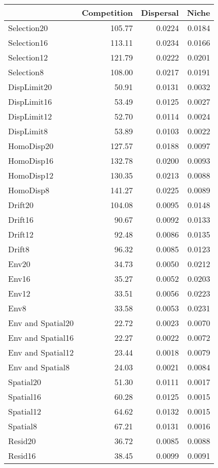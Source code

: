 \begin{longtable}{l|rrr}
\toprule
\multicolumn{1}{l}{} & Competition & Dispersal & Niche \\ 
\midrule
Selection20 & 105.77 & 0.0224 & 0.0184 \\ 
Selection16 & 113.11 & 0.0234 & 0.0166 \\ 
Selection12 & 121.79 & 0.0222 & 0.0201 \\ 
Selection8 & 108.00 & 0.0217 & 0.0191 \\ 
DispLimit20 & 50.91 & 0.0131 & 0.0032 \\ 
DispLimit16 & 53.49 & 0.0125 & 0.0027 \\ 
DispLimit12 & 52.70 & 0.0114 & 0.0024 \\ 
DispLimit8 & 53.89 & 0.0103 & 0.0022 \\ 
HomoDisp20 & 127.57 & 0.0188 & 0.0097 \\ 
HomoDisp16 & 132.78 & 0.0200 & 0.0093 \\ 
HomoDisp12 & 130.35 & 0.0213 & 0.0088 \\ 
HomoDisp8 & 141.27 & 0.0225 & 0.0089 \\ 
Drift20 & 104.08 & 0.0095 & 0.0148 \\ 
Drift16 & 90.67 & 0.0092 & 0.0133 \\ 
Drift12 & 92.48 & 0.0086 & 0.0135 \\ 
Drift8 & 96.32 & 0.0085 & 0.0123 \\ 
Env20 & 34.73 & 0.0050 & 0.0212 \\ 
Env16 & 35.27 & 0.0052 & 0.0203 \\ 
Env12 & 33.51 & 0.0056 & 0.0223 \\ 
Env8 & 33.58 & 0.0053 & 0.0231 \\ 
Env and Spatial20 & 22.72 & 0.0023 & 0.0070 \\ 
Env and Spatial16 & 22.27 & 0.0022 & 0.0072 \\ 
Env and Spatial12 & 23.44 & 0.0018 & 0.0079 \\ 
Env and Spatial8 & 24.03 & 0.0021 & 0.0084 \\ 
Spatial20 & 51.30 & 0.0111 & 0.0017 \\ 
Spatial16 & 60.28 & 0.0125 & 0.0015 \\ 
Spatial12 & 64.62 & 0.0132 & 0.0015 \\ 
Spatial8 & 67.21 & 0.0131 & 0.0016 \\ 
Resid20 & 36.72 & 0.0085 & 0.0088 \\ 
Resid16 & 38.45 & 0.0099 & 0.0091 \\ 

\end{longtable}
